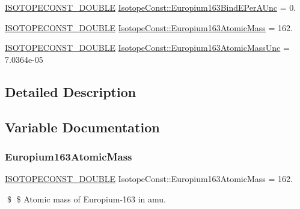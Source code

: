 \begin{DoxyCompactItemize}
\mbox{\hyperlink{group___isotope_const-_macros_ga8f45a7272ce02c0b4c65c44636ed719a}{I\+S\+O\+T\+O\+P\+E\+C\+O\+N\+S\+T\+\_\+\+D\+O\+U\+B\+LE}} \mbox{\hyperlink{group___isotope_const-_europium-_eu163_gaec50da35c03f1ad6a3c19ae1e2381cd2}{Isotope\+Const\+::\+Europium163\+Bind\+E\+Per\+A\+Unc}} = 0.
\item 
\mbox{\hyperlink{group___isotope_const-_macros_ga8f45a7272ce02c0b4c65c44636ed719a}{I\+S\+O\+T\+O\+P\+E\+C\+O\+N\+S\+T\+\_\+\+D\+O\+U\+B\+LE}} \mbox{\hyperlink{group___isotope_const-_europium-_eu163_gadc62e48359a6078b475a8d488af77686}{Isotope\+Const\+::\+Europium163\+Atomic\+Mass}} = 162.
\item 
\mbox{\hyperlink{group___isotope_const-_macros_ga8f45a7272ce02c0b4c65c44636ed719a}{I\+S\+O\+T\+O\+P\+E\+C\+O\+N\+S\+T\+\_\+\+D\+O\+U\+B\+LE}} \mbox{\hyperlink{group___isotope_const-_europium-_eu163_ga052ab13ea1c7c687c5ba93bd6942c988}{Isotope\+Const\+::\+Europium163\+Atomic\+Mass\+Unc}} = 7.\+0364e-\/05
\end{DoxyCompactItemize}


\subsection{Detailed Description}


\subsection{Variable Documentation}
\mbox{\label{group___isotope_const-_europium-_eu163_gadc62e48359a6078b475a8d488af77686}} 
\subsubsection{\texorpdfstring{Europium163\+Atomic\+Mass}{Europium163AtomicMass}}
{\footnotesize\ttfamily \mbox{\hyperlink{group___isotope_const-_macros_ga8f45a7272ce02c0b4c65c44636ed719a}{I\+S\+O\+T\+O\+P\+E\+C\+O\+N\+S\+T\+\_\+\+D\+O\+U\+B\+LE}} Isotope\+Const\+::\+Europium163\+Atomic\+Mass = 162.}

\$ \$ Atomic mass of Europium-\/163 in amu. \mbox{\label{group___isotope_const-_europium-_eu163_ga052ab13ea1c7c687c5ba93bd6942c988}} 
